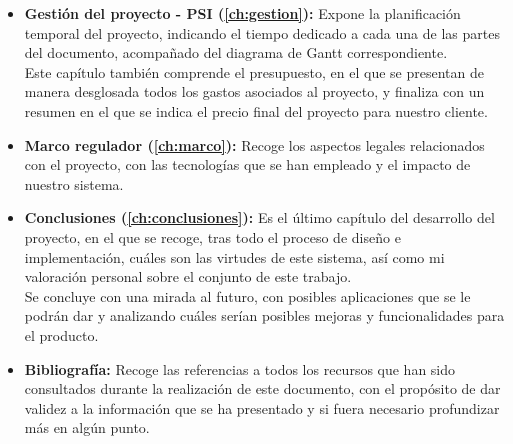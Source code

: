 \begin{itemize}
	\item \textbf{Gestión del proyecto - PSI (\autoref{ch:gestion}):} Expone la planificación temporal del proyecto, indicando el tiempo dedicado a cada una de las partes del documento, acompañado del diagrama de Gantt correspondiente. \\ Este capítulo también comprende el presupuesto, en el que se presentan de manera desglosada todos los gastos asociados al proyecto, y finaliza con un resumen en el que se indica el precio final del proyecto para nuestro cliente.
	\item \textbf{Marco regulador (\autoref{ch:marco}):} Recoge los aspectos legales relacionados con el proyecto, con las tecnologías que se han empleado y el impacto de nuestro sistema.
	\item \textbf{Conclusiones (\autoref{ch:conclusiones}):} Es el último capítulo del desarrollo del proyecto, en el que se recoge, tras todo el proceso de diseño e implementación, cuáles son las virtudes de este sistema, así como mi valoración personal sobre el conjunto de este trabajo. \\ Se concluye con una mirada al futuro, con posibles aplicaciones que se le podrán dar y analizando cuáles serían posibles mejoras y funcionalidades para el producto.
	\item \textbf{Bibliografía:} Recoge las referencias a todos los recursos que han sido consultados durante la realización de este documento, con el propósito de dar validez a la información que se ha presentado y si fuera necesario profundizar más en algún punto.
\end{itemize}